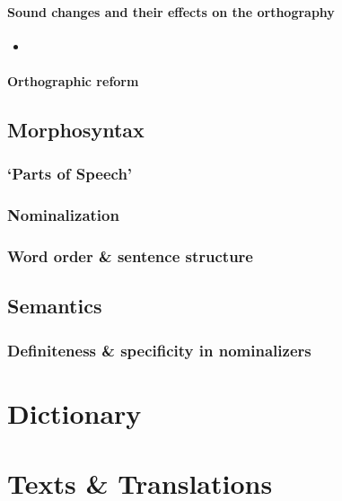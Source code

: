 \documentclass[a4paper,11pt,oneside,openany]{memoir}
\begin{document}
\subsection{Sound changes and their effects on the orthography}

\begin{itemize}
    \item 
\end{itemize}

\subsection{Orthographic reform}

\chapter{Morphosyntax}

\section{`Parts of Speech'}

\section{Nominalization}

\section{Word order \& sentence structure}

\chapter{Semantics}

\section{Definiteness \& specificity in nominalizers}

\part{Dictionary}



\part{Texts \& Translations}

\end{document}
